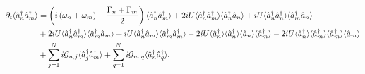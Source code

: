 \begin{align}
\partial_t\langle\hat{a}_n^\dagger\hat{a}_m^\dagger\rangle &= \left(i \left(\omega_n + \omega_m\right) - \frac{\Gamma_n + \Gamma_m}{2}\right) \langle \hat{a}_n^\dagger \hat{a}_m^\dagger\rangle + 2 i U \langle\hat{a}_n^\dagger \hat{a}_m^\dagger\rangle \langle \hat{a}_n^\dagger \hat{a}_n\rangle + i U \langle \hat{a}_n^\dagger \hat{a}_n^\dagger \rangle \langle \hat{a}_m^\dagger \hat{a}_n\rangle \notag \\
&+ 2 i U \langle\hat{a}_n^\dagger \hat{a}_m^\dagger \rangle \langle \hat{a}_m^\dagger \hat{a}_m\rangle + i U \langle \hat{a}_n^\dagger \hat{a}_m\rangle \langle \hat{a}_m^\dagger \hat{a}_m^\dagger \rangle - 2 i U \langle\hat{a}_n^\dagger \rangle \langle \hat{a}_n^\dagger \rangle \langle \hat{a}_n \rangle \langle \hat{a}_m^\dagger\rangle - 2 i U \langle \hat{a}_n^\dagger \rangle \langle \hat{a}_m^\dagger \rangle \langle \hat{a}_m^\dagger \rangle \langle \hat{a}_m\rangle \notag \\
& + \sum_{j=1}^N i \mathcal{G}_{n, j} \langle\hat{a}_j^\dagger \hat{a}_m^\dagger\rangle + \sum_{q=1}^N i \mathcal{G}_{m, q} \langle\hat{a}_n^\dagger \hat{a}_q^\dagger\rangle.
\end{align} 
\iffalse
\fi